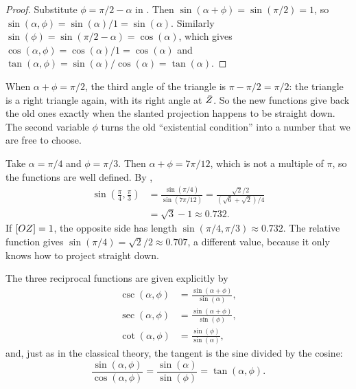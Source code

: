 \begin{proof}
Substitute $\phi = \pi/2 - \alpha$ in . Then $\sin(\alpha + \phi) = \sin(\pi/2) = 1$, so $\sin(\alpha, \phi) = \sin(\alpha)/1 = \sin(\alpha)$. Similarly $\sin(\phi) = \sin(\pi/2 - \alpha) = \cos(\alpha)$, which gives $\cos(\alpha, \phi) = \cos(\alpha)/1 = \cos(\alpha)$ and $\tan(\alpha, \phi) = \sin(\alpha)/\cos(\alpha) = \tan(\alpha)$.
\end{proof}

\begin{plainwords}
When $\alpha + \phi = \pi/2$, the third angle of the triangle is $\pi - \pi/2 = \pi/2$: the triangle is a right triangle again, with its right angle at $\bar{Z}$. So the new functions give back the old ones exactly when the slanted projection happens to be straight down. The second variable $\phi$ turns the old ``existential condition'' into a number that we are free to choose.
\end{plainwords}

\begin{workedexample}
Take $\alpha = \pi/4$ and $\phi = \pi/3$. Then $\alpha + \phi = 7\pi/12$, which is not a multiple of $\pi$, so the functions are well defined. By ,
\begin{align*}
\sin\left(\tfrac{\pi}{4}, \tfrac{\pi}{3}\right) &= \frac{\sin(\pi/4)}{\sin(7\pi/12)} = \frac{\sqrt{2}/2}{(\sqrt{6} + \sqrt{2})/4} \\
&= \sqrt{3} - 1 \approx 0.732 .
\end{align*}
If $[OZ] = 1$, the opposite side has length $\sin(\pi/4, \pi/3) \approx 0.732$. The relative function gives $\sin(\pi/4) = \sqrt{2}/2 \approx 0.707$, a different value, because it only knows how to project straight down.
\end{workedexample}

The three reciprocal functions are given explicitly by
\begin{align*}
\csc(\alpha, \phi) &= \frac{\sin(\alpha + \phi)}{\sin(\alpha)}, \\
\sec(\alpha, \phi) &= \frac{\sin(\alpha + \phi)}{\sin(\phi)}, \\
\cot(\alpha, \phi) &= \frac{\sin(\phi)}{\sin(\alpha)},
\end{align*}
and, just as in the classical theory, the tangent is the sine divided by the cosine:
\[
\frac{\sin(\alpha, \phi)}{\cos(\alpha, \phi)} = \frac{\sin(\alpha)}{\sin(\phi)} = \tan(\alpha, \phi).
\]

